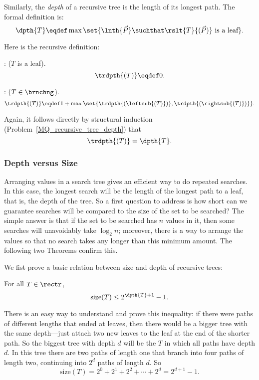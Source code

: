 \begin{definition}
Similarly, the \emph{depth}  of a recursive tree is
the length of its longest path.  The formal definition is:
\begin{equation}\label{defdepth}
\dpth{T} \eqdef \max \set{\lnth{\vec{P}} \suchthat
  \rslt{T}{(\vec{P})}\ \text{is a leaf}}.
\end{equation}

Here is the recursive definition:
\begin{definition}
: ($T$ is a leaf).
\[
\trdpth{(T)} \eqdef 0.
\]

: ($T \in\brnchng$).
\[
\trdpth{(T)} \eqdef 1+\max\set{\trdpth{(\leftsub{(T)})}, \trdpth{(\rightsub{(T)})}}.
\]
\end{definition}

Again, it follows directly by structural induction
(Problem~\ref{MQ_recursive_tree_depth}) that
\begin{equation}\label{recdepth=depth}
\trdpth{(T)} = \dpth{T}.
\end{equation}

\subsubsection{Depth versus Size}

Arranging values in a search tree gives an efficient way to do
repeated searches.  In this case, the longest search will be the
length of the longest path to a leaf, that is, the depth of the tree.
So a first question to address is how short can we guarantee searches
will be compared to the size of the set to be searched?  The simple
answer is that if the set to be searched has $n$ values in it, then
some searches will unavoidably take $\log_2 n$; moreover, there is a
way to arrange the values so that no search takes any longer than this
minimum amount.  The following two Theorems confirm this.

We fist prove a basic relation between size and depth of recursive
trees:
\begin{theorem}\label{szT2d1}
For all $T \in \rectr$,
\begin{equation}\label{sT2d+1}
\text{size}(T) \leq 2^{\dpth{T}+1} - 1.
\end{equation}
\end{theorem}

There is an easy way to understand and prove this inequality: if
there were paths of different lengths that ended at leaves, then there
would be a bigger tree with the same depth---just attach two new
leaves to the leaf at the end of the shorter path.  So the biggest
tree with depth $d$ will be the  $T$ in which all
paths have depth $d$.  In this tree there are two paths of length one
that branch into four paths of length two, continuing into $2^d$ paths
of length $d$.  So
\[
\text{size}(T) = 2^0 + 2^1 + 2^2 + \cdots + 2^d = 2^{d+1}-1.
\]


\end{definition}
